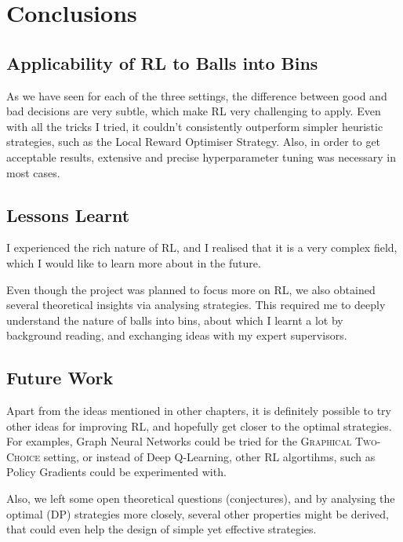 
\chapter{Conclusions}\label{conclusion}

\ifpdf
    \graphicspath{{Chapter3/Figs/Raster/}{Chapter3/Figs/PDF/}{Chapter3/Figs/}}
\else
    \graphicspath{{Chapter3/Figs/Vector/}{Chapter3/Figs/}}
\fi



\section{Applicability of RL to Balls into Bins}

As we have seen for each of the three settings, the difference between good and bad decisions are very subtle, which make RL very challenging to apply. Even with all the tricks I tried, it couldn't consistently outperform simpler heuristic strategies, such as the Local Reward Optimiser Strategy. Also, in order to get acceptable results, extensive and precise hyperparameter tuning was necessary in most cases. 



\section{Lessons Learnt}

I experienced the rich nature of RL, and I realised that it is a very complex field, which I would like to learn more about in the future. 

Even though the project was planned to focus more on RL, we also obtained several theoretical insights via analysing strategies. This required me to deeply understand the nature of balls into bins, about which I learnt a lot by background reading, and exchanging ideas with my expert supervisors. 

\section{Future Work}

Apart from the ideas mentioned in other chapters, it is definitely possible to try other ideas for improving RL, and hopefully get closer to the optimal strategies. For examples, Graph Neural Networks could be tried for the \textsc{Graphical Two-Choice} setting, or instead of Deep Q-Learning, other RL algortihms, such as Policy Gradients could be experimented with. 


Also, we left some open theoretical questions (conjectures), and by analysing the optimal (DP) strategies more closely, several other properties might be derived, that could even help the design of simple yet effective strategies.